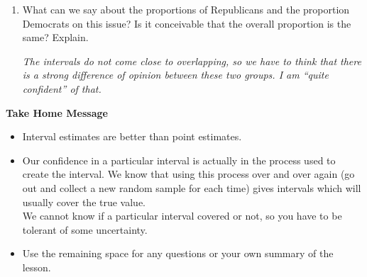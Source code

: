 \begin{enumerate}
\begin{enumerate}
\begin{key}
  {\em We are 95\% confident that the true }
\end{key}

\item What can we say about the proportions of Republicans and the
  proportion Democrats on this issue? Is it conceivable that the
  overall proportion is the same?  Explain.

\begin{students}
\vspace{2.8cm}
\end{students}

\begin{key}
  {\em The intervals do not come close to overlapping, so we have to
    think that there is a strong difference of opinion between these
    two groups. I am ``quite confident'' of that.}
\end{key}
    \end{enumerate}
  
  \end{enumerate}


\begin{center}
  {\large \bf Take Home Message} 
\end{center}

\begin{itemize}
\item Interval estimates are better than point estimates.
\item Our confidence in a particular interval is actually in the
  process used to create the interval.  We know that using this
  process over and over again (go out and collect a new random sample
  for each time) gives intervals which will usually
  cover the true value.\\
   We cannot know if a particular interval covered or not, so you have
   to be tolerant of some uncertainty.
 \item 
  Use the remaining space for any questions or your own summary of the
  lesson. 
\end{itemize}




